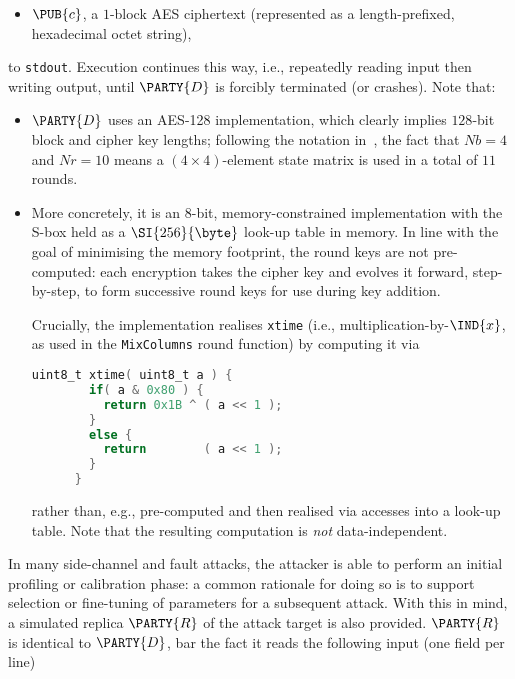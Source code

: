 \begin{itemize}
\item $\PUB{c}$,
      a  ${1}$-block AES ciphertext
      (represented as a  length-prefixed, hexadecimal octet   string),
\end{itemize}

\noindent
to   \lstinline[language={bash}]{stdout}.
Execution continues this way, i.e., repeatedly reading input then writing 
output, until $\PARTY{D}$ is forcibly terminated (or crashes).
Note that:

\begin{itemize}
\item $\PARTY{D}$ uses an AES-128 implementation,
      which clearly implies $128$-bit block and cipher key lengths;
      following the notation in~\cite[Figure 5]{SCALE:FIPS:197:01}, the 
      fact that 
      $
      Nb =  4
      $ 
      and 
      $
      Nr = 10
      $ 
      means a $( 4 \times 4 )$-element state matrix is used in a total of 
      $11$ rounds.
\item More concretely, it is an $8$-bit, memory-constrained implementation
      with the S-box held as a $\SI{256}{\byte}$ look-up table in memory. 
      In line with the goal of minimising the memory footprint, the round
      keys are not pre-computed: each encryption takes the cipher key and
      evolves it forward, step-by-step, to form successive round keys for
      use during key addition.  

      Crucially, the implementation realises 
      \lstinline[language={C}]|xtime| (i.e., multiplication-by-$\IND{x}$,
      as used in the \lstinline{MixColumns} round function) by computing
      it via

      \begin{lstlisting}[language={C},gobble={6},frame={single},basicstyle={\ttfamily\small}]
      uint8_t xtime( uint8_t a ) {
        if( a & 0x80 ) {
          return 0x1B ^ ( a << 1 );
        }
        else {
          return        ( a << 1 );
        }
      }
      \end{lstlisting}

      \noindent
      rather than, e.g., pre-computed and then realised via accesses into 
      a look-up table.  Note that the resulting computation is {\em not} 
      data-independent.
\end{itemize}


In many side-channel and fault attacks, the attacker is able to perform an 
initial profiling or calibration phase: a common rationale for doing so is 
to support selection or fine-tuning of parameters for a subsequent attack.  
With this in mind, a simulated replica $\PARTY{R}$ of the attack target is 
also provided.
$\PARTY{R}$ is identical to $\PARTY{D}$, bar the fact it
 reads the following  input (one field per line)

